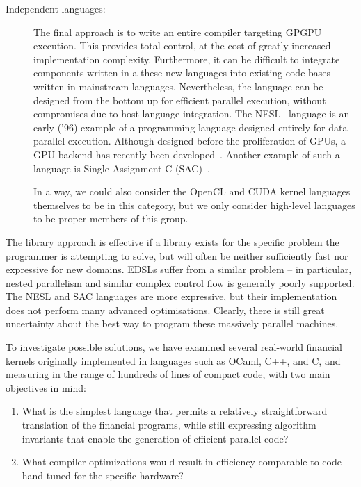 \begin{description}
\begin{description}
\item[Independent languages:] The final approach is to write an entire
  compiler targeting GPGPU execution.  This provides total control, at
  the cost of greatly increased implementation complexity.
  Furthermore, it can be difficult to integrate components written in
  a these new languages into existing code-bases written in mainstream
  languages.  Nevertheless, the language can be designed from the
  bottom up for efficient parallel execution, without compromises due
  to host language integration.  The NESL~\cite{BlellochCACM96NESL}
  language is an early ('96) example of a programming language
  designed entirely for data-parallel execution.  Although designed
  before the proliferation of GPUs, a GPU backend has recently been
  developed~\cite{bergstrom2012nested}.  Another example of such a
  language is Single-Assignment C (SAC)~\cite{grelck2006sac}.

  In a way, we could also consider the OpenCL and CUDA kernel
  languages themselves to be in this category, but we only consider
  high-level languages to be proper members of this group.
\end{description}
\end{description}

The library approach is effective if a library exists for the specific
problem the programmer is attempting to solve, but will often be
neither sufficiently fast nor expressive for new domains.  EDSLs
suffer from a similar problem -- in particular, nested parallelism and
similar complex control flow is generally poorly supported.  The NESL
and SAC languages are more expressive, but their implementation does
not perform many advanced optimisations.  Clearly, there is still
great uncertainty about the best way to program these massively
parallel machines.

To investigate possible solutions, we have examined several real-world
financial kernels originally implemented in languages such as OCaml,
C++, and C, and measuring in the range of hundreds of lines of compact
code, with two main objectives in mind:

\begin{enumerate}
\item What is the simplest language that permits a relatively
  straightforward translation of the financial programs, while still
  expressing algorithm invariants that enable the generation of
  efficient parallel code?

\item What compiler optimizations would result in efficiency
  comparable to code hand-tuned for the specific hardware?
\end{enumerate}

